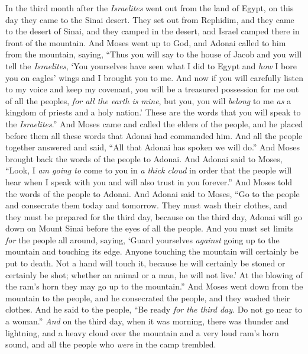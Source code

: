 \begin{biblechapter} %
 In the third month after the \textit{Israelites} went out from the land of Egypt, on this day they came to the Sinai desert.
\verse They set out from Rephidim, and they came to the desert of Sinai, and they camped in the desert, and Israel camped there in front of the mountain.
\verse And Moses went up to God, and Adonai called to him from the mountain, saying, “Thus you will say to the house of Jacob and you will tell the \textit{Israelites},
\verse ‘You yourselves have seen what I did to Egypt and \textit{how} I bore you on eagles’ wings and I brought you to me.
\verse And now if you will carefully listen to my voice and keep my covenant, you will be a treasured possession for me out of all the peoples, \textit{for all the earth is mine},
\verse but you, you will \textit{belong} to me \textit{as} a kingdom of priests and a holy nation.’ These are the words that you will speak to the \textit{Israelites}.”
\verse And Moses came and called the elders of the people, and he placed before them all these words that Adonai had commanded him.
\verse And all the people together answered and said, “All that Adonai has spoken we will do.” And Moses brought back the words of the people to Adonai.
\verse And Adonai said to Moses, “Look, I \textit{am going to} come to you in \textit{a thick cloud} in order that the people will hear when I speak with you and will also trust in you forever.” And Moses told the words of the people to Adonai.
\verse And Adonai said to Moses, “Go to the people and consecrate them today and tomorrow. They must wash their clothes,
\verse and they must be prepared for the third day, because on the third day, Adonai will go down on Mount Sinai before the eyes of all the people.
\verse And you must set limits \textit{for} the people all around, saying, ‘Guard yourselves \textit{against} going up to the mountain and touching its edge. Anyone touching the mountain will certainly be put to death.
\verse Not a hand will touch it, because he will certainly be stoned or certainly be shot; whether an animal or a man, he will not live.’ At the blowing of the ram’s horn they may go up to the mountain.”
\verse And Moses went down from the mountain to the people, and he consecrated the people, and they washed their clothes.
\verse And he said to the people, “Be ready \textit{for the third day}. Do not go near to a woman.”
\verse \textit{And} on the third day, when it was morning, there was thunder and lightning, and a heavy cloud over the mountain and a very loud ram’s horn sound, and all the people who \textit{were} in the camp trembled.

\end{biblechapter}
